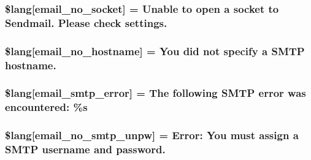 \subsubsection[{\$lang}]{\setlength{\rightskip}{0pt plus 5cm}\$lang\mbox{[}\textquotesingle{}email\+\_\+no\+\_\+socket\textquotesingle{}\mbox{]} = \textquotesingle{}Unable to open {\bf a} socket to Sendmail. Please check settings.\textquotesingle{}}\label{email__lang_8php_a78f8be783ca93e91af775994ddc87cb7}
\hypertarget{email__lang_8php_a03905b414e05a5d3cfd0fe88868615f5}{}
\subsubsection[{\$lang}]{\setlength{\rightskip}{0pt plus 5cm}\$lang\mbox{[}\textquotesingle{}email\+\_\+no\+\_\+hostname\textquotesingle{}\mbox{]} = \textquotesingle{}You did not specify {\bf a} S\+M\+T\+P hostname.\textquotesingle{}}\label{email__lang_8php_a03905b414e05a5d3cfd0fe88868615f5}
\hypertarget{email__lang_8php_a3d70a704117491053ad9c0b4065ecd3f}{}
\subsubsection[{\$lang}]{\setlength{\rightskip}{0pt plus 5cm}\$lang\mbox{[}\textquotesingle{}email\+\_\+smtp\+\_\+error\textquotesingle{}\mbox{]} = \textquotesingle{}The following S\+M\+T\+P error was encountered\+: \%s\textquotesingle{}}\label{email__lang_8php_a3d70a704117491053ad9c0b4065ecd3f}
\hypertarget{email__lang_8php_a268c3e96fea16a903e7488f03960e89a}{}
\subsubsection[{\$lang}]{\setlength{\rightskip}{0pt plus 5cm}\$lang\mbox{[}\textquotesingle{}email\+\_\+no\+\_\+smtp\+\_\+unpw\textquotesingle{}\mbox{]} = \textquotesingle{}Error\+: You must assign {\bf a} S\+M\+T\+P username and password.\textquotesingle{}}\label{email__lang_8php_a268c3e96fea16a903e7488f03960e89a}
\hypertarget{email__lang_8php_a791781c2fd1bd8ec87158be649519621}{}
